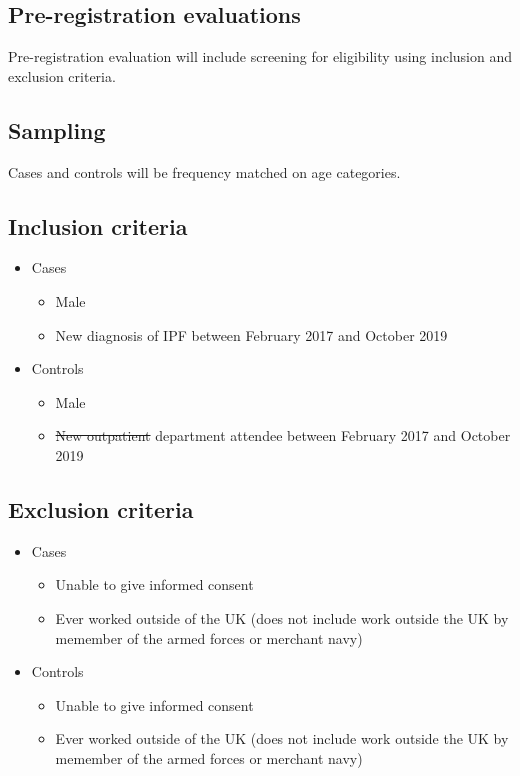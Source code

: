 \documentclass[a4paper,10pt]{article}
\newcommand{\studystart}{February 2017 }
\newcommand{\studyend}{October 2019 }
\providecommand{\DIFaddtex}[1]{{\protect\color{blue}\uwave{#1}}} %
\providecommand{\DIFdeltex}[1]{{\protect\color{red}\sout{#1}}}                      %
\providecommand{\DIFaddbegin}{} %
\providecommand{\DIFaddend}{} %
\providecommand{\DIFdelbegin}{} %
\providecommand{\DIFdelend}{} %
\providecommand{\DIFadd}[1]{\texorpdfstring{\DIFaddtex{#1}}{#1}} %
\providecommand{\DIFdel}[1]{\texorpdfstring{\DIFdeltex{#1}}{}} %
\begin{document}
\subsection{Pre-registration evaluations}
Pre-registration evaluation will include screening for eligibility using inclusion and exclusion criteria.

\subsection{Sampling}
Cases and controls will be frequency matched on age categories.

\subsection{Inclusion criteria}
 \begin{itemize} 
 \item Cases  \begin{itemize} 
        \item Male
        \item New diagnosis of IPF between \studystart and \studyend 
        \end{itemize} 

  \item Controls  \begin{itemize} 
        \item Male
        \item \DIFdelbegin \DIFdel{New outpatient }\DIFdelend \DIFaddbegin \DIFadd{Outpatient }\DIFaddend department attendee between \studystart and \studyend
        \end{itemize} 

 \end{itemize} 


\subsection{Exclusion criteria}
 \begin{itemize} 
 \item Cases  \begin{itemize} 
        \item Unable to give informed consent
        \item Ever worked outside of the UK (does not include work outside the UK by memember of the armed forces or merchant navy)
        \end{itemize} 

  \item Controls  \begin{itemize} 
        \item Unable to give informed consent
        \item Ever worked outside of the UK (does not include work outside the UK by memember of the armed forces or merchant navy)
        \end{itemize} 

 \end{itemize} 
\end{document}
